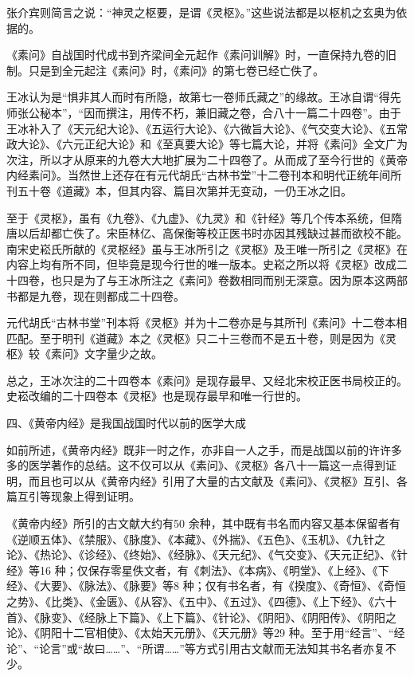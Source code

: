 \documentclass[a4paper,12pt,UTF8,twoside]{ctexbook}
\begin{document}
张介宾则简言之说：“神灵之枢要，是谓《灵枢》。”这些说法都是以枢机之玄奥为依据的。

《素问》自战国时代成书到齐梁间全元起作《素问训解》时，一直保持九卷的旧制。只是到全元起注《素问》时，《素问》的第七卷已经亡佚了。

王冰认为是“惧非其人而时有所隐，故第七一卷师氏藏之”的缘故。王冰自谓“得先师张公秘本”，“因而撰注，用传不朽，兼旧藏之卷，合八十一篇二十四卷”。由于王冰补入了《天元纪大论》、《五运行大论》、《六微旨大论》、《气交变大论》、《五常政大论》、《六元正纪大论》和《至真要大论》等七篇大论，并将《素问》全文广为次注，所以才从原来的九卷大大地扩展为二十四卷了。从而成了至今行世的《黄帝内经素问》。当然世上还存在有元代胡氏“古林书堂”十二卷刊本和明代正统年间所刊五十卷《道藏》本，但其内容、篇目次第并无变动，一仍王冰之旧。

至于《灵枢》，虽有《九卷》、《九虚》、《九灵》和《针经》等几个传本系统，但隋唐以后却都亡佚了。宋臣林亿、高保衡等校正医书时亦因其残缺过甚而欲校不能。南宋史崧氏所献的《灵枢经》虽与王冰所引之《灵枢》及王唯一所引之《灵枢》在内容上均有所不同，但毕竟是现今行世的唯一版本。史崧之所以将《灵枢》改成二十四卷，也只是为了与王冰所注之《素问》卷数相同而别无深意。因为原本这两部书都是九卷，现在则都成二十四卷。

元代胡氏“古林书堂”刊本将《灵枢》并为十二卷亦是与其所刊《素问》十二卷本相匹配。至于明刊《道藏》本之《灵枢》只二十三卷而不是五十卷，则是因为《灵枢》较《素问》文字量少之故。

总之，王冰次注的二十四卷本《素问》是现存最早、又经北宋校正医书局校正的。史崧改编的二十四卷本《灵枢》也是现存最早和唯一行世的。

四、《黄帝内经》是我国战国时代以前的医学大成

如前所述，《黄帝内经》既非一时之作，亦非自一人之手，而是战国以前的许许多多的医学著作的总结。这不仅可以从《素问》、《灵枢》各八十一篇这一点得到证明，而且也可以从《黄帝内经》引用了大量的古文献及《素问》、《灵枢》互引、各篇互引等现象上得到证明。

《黄帝内经》所引的古文献大约有50 余种，其中既有书名而内容又基本保留者有《逆顺五体》、《禁服》、《脉度》、《本藏》、《外揣》、《五色》、《玉机》、《九针之论》、《热论》、《诊经》、《终始》、《经脉》、《天元纪》、《气交变》、《天元正纪》、《针经》等16 种；仅保存零星佚文者，有《刺法》、《本病》、《明堂》、《上经》、《下经》、《大要》、《脉法》、《脉要》等8 种；仅有书名者，有《揆度》、《奇恒》、《奇恒之势》、《比类》、《金匮》、《从容》、《五中》、《五过》、《四德》、《上下经》、《六十首》、《脉变》、《经脉上下篇》、《上下篇》、《针论》、《阴阳》、《阴阳传》、《阴阳之论》、《阴阳十二官相使》、《太始天元册》、《天元册》等29 种。至于用“经言”、“经论”、“论言”或“故曰……”、“所谓……”等方式引用古文献而无法知其书名者亦复不少。
\end{document}
